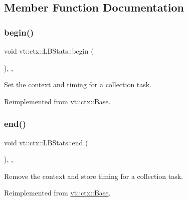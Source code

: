 \subsection{Member Function Documentation}
\mbox{\label{structvt_1_1ctx_1_1_l_b_stats_a209aad8645b7e7a4328b71c29f935da4}} 
\subsubsection{\texorpdfstring{begin()}{begin()}}
{\footnotesize\ttfamily void vt\+::ctx\+::\+L\+B\+Stats\+::begin (\begin{DoxyParamCaption}{ }\end{DoxyParamCaption})\hspace{0.3cm}{\ttfamily [final]}, {\ttfamily [override]}, {\ttfamily [virtual]}}



Set the context and timing for a collection task. 



Reimplemented from \hyperlink{structvt_1_1ctx_1_1_base_aab5524952e1bb163ccba5df64a303168}{vt\+::ctx\+::\+Base}.

\mbox{\label{structvt_1_1ctx_1_1_l_b_stats_a55efc4d1d6eb579943b5b39d2a823328}} 
\subsubsection{\texorpdfstring{end()}{end()}}
{\footnotesize\ttfamily void vt\+::ctx\+::\+L\+B\+Stats\+::end (\begin{DoxyParamCaption}{ }\end{DoxyParamCaption})\hspace{0.3cm}{\ttfamily [final]}, {\ttfamily [override]}, {\ttfamily [virtual]}}



Remove the context and store timing for a collection task. 



Reimplemented from \hyperlink{structvt_1_1ctx_1_1_base_a113bac732b2831caa8eed11609ccaf0e}{vt\+::ctx\+::\+Base}.

